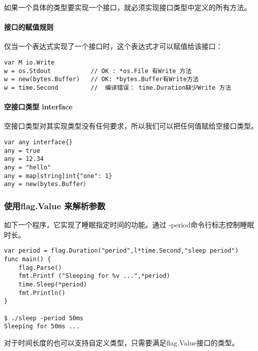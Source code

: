 如果一个具体的类型要实现一个接口，就必须实现接口类型中定义的所有方法。

\hypertarget{ux63a5ux53e3ux7684ux8d4bux503cux89c4ux5219}{%
\paragraph{接口的赋值规则}\label{ux63a5ux53e3ux7684ux8d4bux503cux89c4ux5219}}

仅当一个表达式实现了一个接口时，这个表达式才可以赋值给该接口：

\begin{verbatim}
var M io.Write 
w = os.Stdout           // OK : *os.File 有Write 方法
w = new(bytes.Buffer)   // OK: *bytes.Buffer有Write方法
w = time.Second         //  编译错误： time.Duration缺少Write 方法
\end{verbatim}

\hypertarget{ux7a7aux63a5ux53e3ux7c7bux578b-interface}{%
\paragraph{空接口类型
interface}\label{ux7a7aux63a5ux53e3ux7c7bux578b-interface}}

空接口类型对其实现类型没有任何要求，所以我们可以把任何值赋给空接口类型。

\begin{verbatim}
var any interface{}
any = true
any = 12.34
any = "hello"
any = map[string]int{"one": 1}
any = new(bytes.Buffer）
\end{verbatim}

\hypertarget{ux4f7fux7528flag.value-ux6765ux89e3ux6790ux53c2ux6570}{%
\subsubsection{使用flag.Value
来解析参数}\label{ux4f7fux7528flag.value-ux6765ux89e3ux6790ux53c2ux6570}}

如下一个程序，它实现了睡眠指定时间的功能。通过
-period命令行标志控制睡眠时长。

\begin{verbatim}
var period = flag.Duration("period",l*time.Second,"sleep period")
func main() {
    flag.Parse()
    fmt.Printf ("Sleeping for %v ...",*period)
    time.Sleep(*period)
    fmt.Println()
}

$ ./sleep -period 50ms
Sleeping for 50ms ...
\end{verbatim}

对于时间长度的也可以支持自定义类型，只需要满足flag.Value接口的类型。

